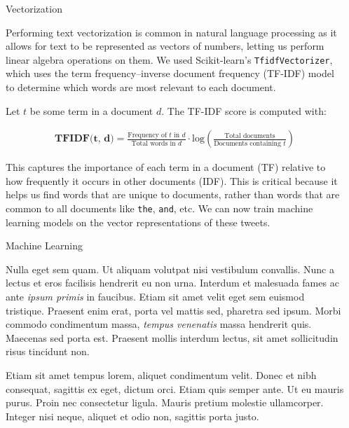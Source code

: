 \documentclass[final]{beamer}
\def\code#1{\texttt{#1}}
\newlength{\sepwidth}
\newlength{\colwidth}
\newcommand{\separatorcolumn}{\begin{column}{\sepwidth}\end{column}}
\begin{document}
\begin{frame}[t]
\begin{columns}[t]
\separatorcolumn

\begin{column}{\colwidth}

  \begin{block}{Vectorization}

    Performing text vectorization is common in natural language processing as it allows for text to be represented as vectors of numbers, letting us perform linear algebra operations on them. We used Scikit-learn's \code{TfidfVectorizer}, which uses the term frequency–inverse document frequency (TF-IDF) model to determine which words are most relevant to each document.
    
    Let $t$ be some term in a document $d$. The TF-IDF score is computed with:

    \begin{align*}
      \textbf{TFIDF(t, d)} = \frac{\text{Frequency of } t \text{ in } d}{\text{Total words in } d}
                       \cdot \text{log}\left(\frac{\text{Total documents}}{\text{Documents containing } t}\right)
    \end{align*}

    This captures the importance of each term in a document (TF) relative to how frequently it occurs in other documents (IDF). This is critical because it helps us find words that are unique to documents, rather than words that are common to all documents like \code{the}, \code{and}, etc. We can now train machine learning models on the vector representations of these tweets.

  \end{block}

  \begin{block}{Machine Learning}

    Nulla eget sem quam. Ut aliquam volutpat nisi vestibulum convallis. Nunc a
    lectus et eros facilisis hendrerit eu non urna. Interdum et malesuada fames
    ac ante \textit{ipsum primis} in faucibus. Etiam sit amet velit eget sem
    euismod tristique. Praesent enim erat, porta vel mattis sed, pharetra sed
    ipsum. Morbi commodo condimentum massa, \textit{tempus venenatis} massa
    hendrerit quis. Maecenas sed porta est. Praesent mollis interdum lectus,
    sit amet sollicitudin risus tincidunt non.

    Etiam sit amet tempus lorem, aliquet condimentum velit. Donec et nibh
    consequat, sagittis ex eget, dictum orci. Etiam quis semper ante. Ut eu
    mauris purus. Proin nec consectetur ligula. Mauris pretium molestie
    ullamcorper. Integer nisi neque, aliquet et odio non, sagittis porta justo.


\end{block}
\end{column}
\end{columns}
\end{frame}
\end{document}
